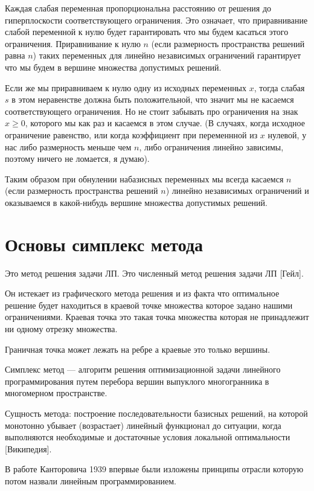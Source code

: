 \documentclass[a4paper,article,14pt]{extarticle}
\begin{document}
Каждая слабая переменная пропорциональна расстоянию от решения до гиперплоскости соответствующего ограничения.
Это означает, что приравнивание слабой переменной к нулю будет гарантировать что мы будем касаться этого ограничения.
Приравнивание к нулю \(n\) (если размерность пространства решений равна \(n\)) таких переменных для линейно независимых ограничений гарантирует что мы будем в вершине множества допустимых решений.

Если же мы приравниваем к нулю одну из исходных переменных \(x\), тогда слабая \(s\) в этом неравенстве должна быть положительной, что значит мы не касаемся соответствующего ограничения.
Но не стоит забывать про ограничения на знак \(x \ge 0\), которого мы как раз и касаемся в этом случае. (В случаях, когда исходное ограничение равенство, или когда коэффициент при переменнной из \(x\) нулевой, у нас либо размерность меньше чем \(n\), либо ограничения линейно зависимы, поэтому ничего не ломается, я думаю).

Таким образом при обнулении набазисных переменных мы всегда касаемся \(n\) (если размерность пространства решений \(n\)) линейно независимых ограничений и оказываемся в какой-нибудь вершине множества допустимых решений.

\newpage


\section{Основы симплекс метода}

Это метод решения задачи ЛП.
Это численный метод решения задачи ЛП [Гейл].

Он истекает из графического метода решения и из факта что оптимальное решение будет находиться в краевой точке множества которое задано нашими ограничениями.
Краевая точка это такая точка множества которая не принадлежит ни одному отрезку множества.

Граничная точка может лежать на ребре а краевые это только вершины.

Симплекс метод --- алгоритм решения оптимизационной задачи линейного программирования путем перебора вершин выпуклого многогранника в многомерном пространстве.

Сущность метода: построение последовательности базисных решений, на которой монотонно убывает (возрастает) линейный функционал до ситуации, когда выполняются необходимые и достаточные условия локальной оптимальности [Википедия].

В работе Канторовича 1939 впервые были изложены принципы отрасли которую потом назвали линейным программированием.
\end{document}
